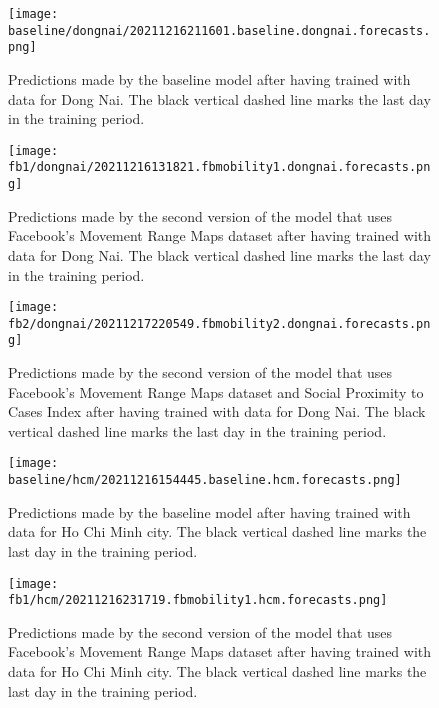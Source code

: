 
\begin{figure}[!htb]
    \centering
    \texttt{[image: baseline/dongnai/20211216211601.baseline.dongnai.forecasts.png]}
    \caption{Predictions made by the baseline model after having trained with data for Dong Nai. The black vertical dashed line marks the last day in the training period.}
    \label{fig:predictions-dongnai-baseline}
\end{figure}

\begin{figure}[!htb]
    \centering
    \texttt{[image: fb1/dongnai/20211216131821.fbmobility1.dongnai.forecasts.png]}
    \caption{Predictions made by the second version of the model that uses Facebook's Movement Range Maps dataset after having trained with data for Dong Nai. The black vertical dashed line marks the last day in the training period.}
    \label{fig:predictions-dongnai-fb1}
\end{figure}

\begin{figure}[!htb]
    \centering
    \texttt{[image: fb2/dongnai/20211217220549.fbmobility2.dongnai.forecasts.png]}
    \caption{Predictions made by the second version of the model that uses Facebook's Movement Range Maps dataset and Social Proximity to Cases Index after having trained with data for Dong Nai. The black vertical dashed line marks the last day in the training period.}
    \label{fig:predictions-dongnai-fb2}
\end{figure}


\begin{figure}[!htb]
    \centering
    \texttt{[image: baseline/hcm/20211216154445.baseline.hcm.forecasts.png]}
    \caption{Predictions made by the baseline model after having trained with data for Ho Chi Minh city. The black vertical dashed line marks the last day in the training period.}
    \label{fig:predictions-hcm-baseline}
\end{figure}

\begin{figure}[!htb]
    \centering
    \texttt{[image: fb1/hcm/20211216231719.fbmobility1.hcm.forecasts.png]}
    \caption{Predictions made by the second version of the model that uses Facebook's Movement Range Maps dataset after having trained with data for Ho Chi Minh city. The black vertical dashed line marks the last day in the training period.}
    \label{fig:predictions-hcm-fb1}
\end{figure}

